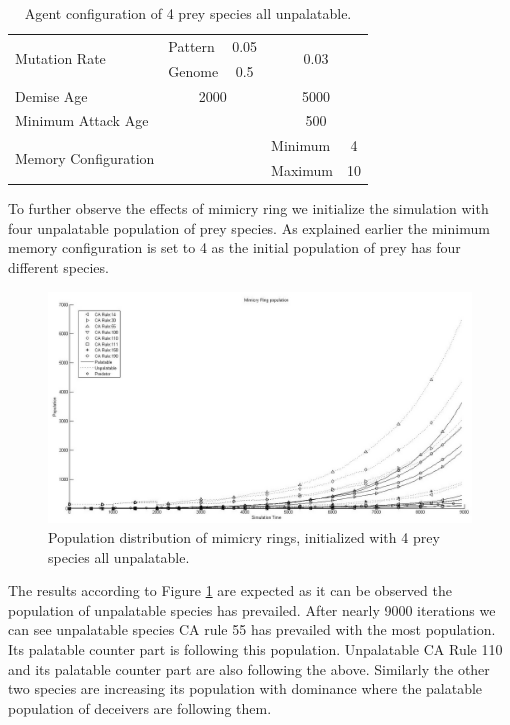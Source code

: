 \begin{table}[H]
\begin{tabular}{|l|l|c|c|l|c|}
  \multirow{2}{*}{Mutation Rate} & Pattern   & \multicolumn{2}{|c|}{0.05} & \multicolumn{2}{|c|}{\multirow{2}{*}{0.03}} \\ \cline{2-4}
  						 									 & Genome    & \multicolumn{2}{|c|}{0.5}  & \multicolumn{2}{|c|}{} \\ \hline
  Demise Age	 									 & \multicolumn{3}{|c|}{2000}							& \multicolumn{2}{|c|}{5000} \\ \hline
  Minimum Attack Age						 & \multicolumn{3}{|c|}{} 						    & \multicolumn{2}{|c|}{500} \\ \hline
  \multirow{2}{*}{Memory Configuration} & \multicolumn{3}{|c|}{} 					& Minimum & 4 \\ \cline{5-6}
   																			& \multicolumn{3}{|c|}{} 					& Maximum & 10 \\ \hline  
\end{tabular}
\caption{Agent configuration of 4 prey species all unpalatable.}
\label{tab:config-table-4-prey-unpalatable}
\end{table}

To further observe the effects of mimicry ring we initialize the simulation with four unpalatable population of prey species. As explained earlier the minimum memory configuration is set to 4 as the initial population of prey has four different species. 

\begin{figure}[H]
	\centering
	\includegraphics[scale=0.40]{images/simTime-9k-4Prey-unp}
	\caption[Population distribution of mimicry rings(4 prey species all unpalatable)]{Population distribution of mimicry rings, initialized with 4 prey species all unpalatable.}
	\label{fig:plot-4-prey-unp}
\end{figure}

The results according to Figure \ref{fig:plot-4-prey-unp} are expected as it can be observed the population of unpalatable species has prevailed. After nearly 9000 iterations we can see unpalatable species CA rule 55 has prevailed with the most population. Its palatable counter part is following this population. Unpalatable CA Rule 110 and its palatable counter part are also following the above. Similarly the other two species are increasing its population with dominance where the palatable population of deceivers are following them. 

